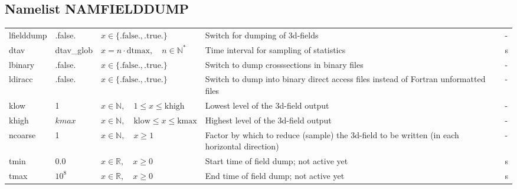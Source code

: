 \documentclass[twoside,11pt,fleqn,a4paper,english,openright]{report}
\begin{document}
\newpage
\subsection{Namelist NAMFIELDDUMP}\label{par:fielddump}

\begin{center}
  \tablelasttail{
        &&&&\\\hline
  }
\begin{supertabular}{|l|p{1.6cm}|p{4.8cm}|p{6cm}|l|}
  lfielddump	& .false.	& $x\in\{\text{.false.},\text{.true.}\}$	& Switch for dumping of 3d-fields		& -\\
  dtav		& dtav\_glob	& $x = n \cdot \text{dtmax}, \quad n \in \mathbb{N}^*$	& Time interval for sampling of statistics	& s\\
  lbinary	& .false.	& $x\in\{\text{.false.},\text{.true.}\}$	& Switch to dump crosssections in binary files	& -\\  
  ldiracc	& .false.	& $x\in\{\text{.false.},\text{.true.}\}$	& Switch to dump into binary direct access files instead of Fortran unformatted files		& -\\
  klow		& 1		& $x \in \mathbb{N}, \quad 1 \le x \le \text{khigh}$	& Lowest level of the 3d-field output		& -\\
  khigh		& $kmax$	& $x \in \mathbb{N}, \quad \text{klow} \le x \le \text{kmax}$	& Highest level of the 3d-field output		& -\\
  ncoarse		& 1	& $x \in \mathbb{N}, \quad x \geq 1 $	& Factor by which to reduce (sample) the 3d-field to be written (in each horizontal direction)	& -\\
  tmin		& 0.0		& $x \in \mathbb{R}, \quad x \geq 0$	& Start time of field dump; not active yet	& s \\
  tmax		& $10^8$	& $x \in \mathbb{R}, \quad x \geq 0$	& End time of field dump; not active yet	& s \\
\end{supertabular}
\end{center}
\end{document}
